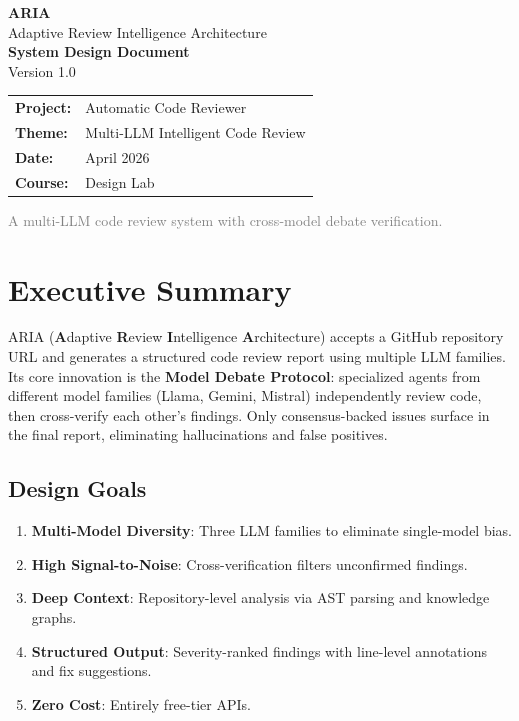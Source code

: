 \documentclass[12pt,a4paper]{article}
\begin{document}
\begin{titlepage}
    \centering
    \vspace*{2cm}
    {\Huge\bfseries\textcolor{ariadark}{ARIA}}\\[0.5cm]
    {\LARGE\textcolor{ariablue}{Adaptive Review Intelligence Architecture}}\\[1.5cm]
    {\Large\textbf{System Design Document}}\\[0.5cm]
    {\large Version 1.0}\\[2cm]
    \begin{tabular}{ll}
        \textbf{Project:} & Automatic Code Reviewer \\
        \textbf{Theme:} & Multi-LLM Intelligent Code Review \\
        \textbf{Date:} & April 2026 \\
        \textbf{Course:} & Design Lab \\
    \end{tabular}
    \vfill
    {\small\textcolor{gray}{A multi-LLM code review system with cross-model debate verification.}}
\end{titlepage}

\tableofcontents
\newpage

\section{Executive Summary}

ARIA (\textbf{A}daptive \textbf{R}eview \textbf{I}ntelligence \textbf{A}rchitecture) accepts a GitHub repository URL and generates a structured code review report using multiple LLM families. Its core innovation is the \textbf{Model Debate Protocol}: specialized agents from different model families (Llama, Gemini, Mistral) independently review code, then cross-verify each other's findings. Only consensus-backed issues surface in the final report, eliminating hallucinations and false positives.

\subsection{Design Goals}
\begin{enumerate}[label=\textbf{G\arabic*.}]
    \item \textbf{Multi-Model Diversity}: Three LLM families to eliminate single-model bias.
    \item \textbf{High Signal-to-Noise}: Cross-verification filters unconfirmed findings.
    \item \textbf{Deep Context}: Repository-level analysis via AST parsing and knowledge graphs.
    \item \textbf{Structured Output}: Severity-ranked findings with line-level annotations and fix suggestions.
    \item \textbf{Zero Cost}: Entirely free-tier APIs.
\end{enumerate}
\end{document}
